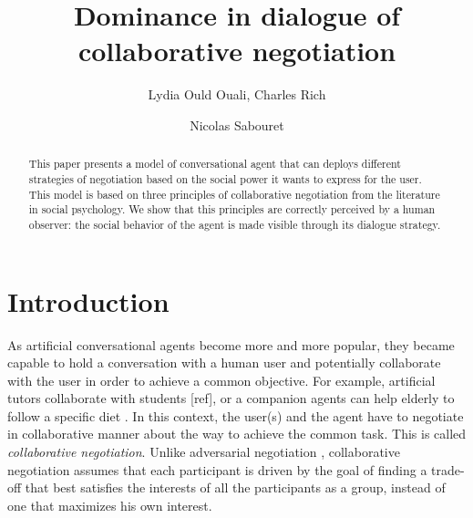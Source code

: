 \documentclass{llncs}
\begin{document}
	\title{\vskip -10pt Dominance in dialogue of collaborative negotiation}
	
	\author{Lydia Ould Ouali, Charles Rich \and
		Nicolas Sabouret }
	

	\maketitle
	
	\begin{abstract}
		This paper presents a model of conversational agent that can deploys different strategies of negotiation based on the social power it wants to express for the user. This model is based on three principles of collaborative negotiation from the literature in social psychology. We show that this principles are correctly perceived by a human observer: the social behavior of the agent is made visible through its dialogue strategy.
	\end{abstract}
	
	\section{Introduction}
	As artificial conversational agents become more and more popular, they became capable to hold a conversation with a human user and potentially collaborate with the user in order to achieve a common objective. For example, artificial tutors collaborate with students [ref], or a companion agents can help elderly to follow a specific diet \cite{kidd2005sociable}. In this context, the user(s) and the agent have to negotiate in collaborative manner about the way to achieve the common task. This is called \emph{collaborative negotiation}. Unlike adversarial negotiation \cite{traum2008multi}, collaborative negotiation assumes that each participant is driven by the goal of finding a trade-off that best satisfies the interests of all the participants as a group, instead of one that maximizes his own interest\cite{sidnerartificial,chu1995response}.
	
\end{document}
